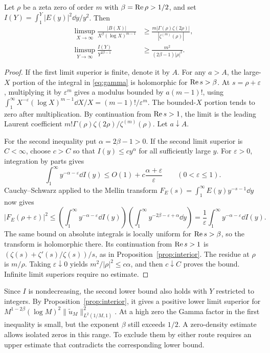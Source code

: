 \begin{proposition}\label{prop:two-pole-bounds}
Let \(\rho\) be a zeta zero of order \(m\) with \(\beta=\operatorname{Re}\rho>1/2\), and set \(I(Y)=\int_1^Y|E(y)|^2\dd y/y^2\). Then
\begin{align*}
 \limsup_{X\to\infty}\frac{|B(X)|}{X^\beta(\log X)^{m-1}}
 &\ge \frac{m|\Gamma(\rho)\zeta(2\rho)|}{|\zeta^{(m)}(\rho)|},\\
 \limsup_{Y\to\infty}\frac{I(Y)}{Y^{2\beta-1}}
 &\ge \frac{m^2}{(2\beta-1)|\rho|^2}.
\end{align*}
\end{proposition}
\begin{proof}
If the first limit superior is finite, denote it by \(A\). For any \(a>A\), the large-\(X\) portion of the integral in \eqref{eq:gamma} is holomorphic for \(\operatorname{Re} s>\beta\). At \(s=\rho+\varepsilon\), multiplying it by \(\varepsilon^m\) gives a modulus bounded by \(a(m-1)!\), using
\(\int_1^\infty X^{-\varepsilon}(\log X)^{m-1}\dd X/X=(m-1)!/\varepsilon^m\).
The bounded-\(X\) portion tends to zero after multiplication. By continuation from \(\operatorname{Re} s>1\), the limit is the leading Laurent coefficient \(m!\Gamma(\rho)\zeta(2\rho)/\zeta^{(m)}(\rho)\). Let \(a\downarrow A\).

For the second inequality put \(\alpha=2\beta-1>0\). If the second limit superior is \(C<\infty\), choose \(c>C\) so that \(I(y)\le c y^\alpha\) for all sufficiently large \(y\). For \(\varepsilon>0\), integration by parts gives
\[
 \int_1^\infty y^{-\alpha-\varepsilon}\dd I(y)
 \le O(1)+c\frac{\alpha+\varepsilon}{\varepsilon}
 \qquad (0<\varepsilon\le1).
\]
Cauchy--Schwarz applied to the Mellin transform \(F_E(s)=\int_1^\infty E(y)y^{-s-1}\dd y\) now gives
\[
 |F_E(\rho+\varepsilon)|^2
 \le \left(\int_1^\infty y^{-\alpha-\varepsilon}\dd I(y)\right)
      \left(\int_1^\infty y^{-2\beta-\varepsilon+\alpha}\dd y\right)
 =\frac1\varepsilon\int_1^\infty y^{-\alpha-\varepsilon}\dd I(y).
\]
The same bound on absolute integrals is locally uniform for \(\operatorname{Re} s>\beta\), so the transform is holomorphic there. Its continuation from \(\operatorname{Re} s>1\) is \((\zeta(s)+\zeta'(s)/\zeta(s))/s\), as in Proposition~\ref{prop:interior}. The residue at \(\rho\) is \(m/\rho\). Taking \(\varepsilon\downarrow0\) yields \(m^2/|\rho|^2\le c\alpha\), and then \(c\downarrow C\) proves the bound. Infinite limit superiors require no estimate.
\end{proof}

Since \(I\) is nondecreasing, the second lower bound also holds with \(Y\) restricted to integers. By Proposition~\ref{prop:interior}, it gives a positive lower limit superior for \(M^{1-2\beta}(\log M)^2\|\widetilde u_M\|_{L^2(1/M,1)}^2\). At a high zero the Gamma factor in the first inequality is small, but the exponent \(\beta\) still exceeds \(1/2\). A zero-density estimate allows isolated zeros in this range. To exclude them by either route requires an upper estimate that contradicts the corresponding lower bound.

